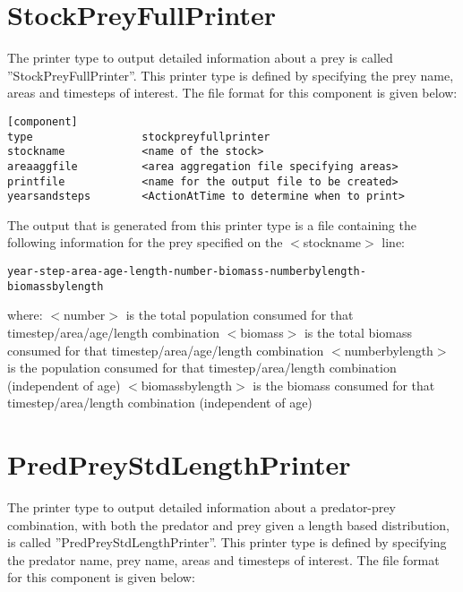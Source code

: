 \documentclass [a4paper, 10pt]{book}
\begin{document}
\section{StockPreyFullPrinter}\label{sec:stockpreyfullprinter}
The printer type to output detailed information about a prey is called ''StockPreyFullPrinter''.  This printer type is defined by specifying the prey name, areas and timesteps of interest.  The file format for this component is given below:

{\small\begin{verbatim}
[component]
type                 stockpreyfullprinter
stockname            <name of the stock>
areaaggfile          <area aggregation file specifying areas>
printfile            <name for the output file to be created>
yearsandsteps        <ActionAtTime to determine when to print>
\end{verbatim}}

The output that is generated from this printer type is a file containing the following information for the prey specified on the $<$stockname$>$ line:

{\small\begin{verbatim}
year-step-area-age-length-number-biomass-numberbylength-biomassbylength
\end{verbatim}}

where:\newline
$<$number$>$ is the total population consumed for that timestep/area/age/length combination\newline
$<$biomass$>$ is the total biomass consumed for that timestep/area/age/length combination\newline
$<$numberbylength$>$ is the population consumed for that timestep/area/length combination (independent of age)\newline
$<$biomassbylength$>$ is the biomass consumed for that timestep/area/length combination (independent of age)

\section{PredPreyStdLengthPrinter}\label{sec:predpreystdlengthprinter}
The printer type to output detailed information about a predator-prey combination, with both the predator and prey given a length based distribution, is called ''PredPreyStdLengthPrinter''.  This printer type is defined by specifying the predator name, prey name, areas and timesteps of interest.  The file format for this component is given below:
\end{document}
